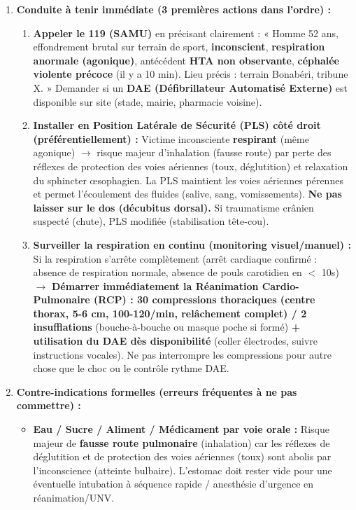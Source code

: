 \documentclass[11pt]{article}
\begin{document}
\begin{exoresolu}
\begin{enumerate}
    \item \textbf{Conduite à tenir immédiate (3 premières actions dans l'ordre) :}
        \begin{enumerate}
            \item \textbf{Appeler le 119 (SAMU)} en précisant clairement : « Homme 52 ans, effondrement brutal sur terrain de sport, \textbf{inconscient}, \textbf{respiration anormale (agonique)}, antécédent \textbf{HTA non observante}, \textbf{céphalée violente précoce} (il y a 10 min). Lieu précis : terrain Bonabéri, tribune X. » Demander si un \textbf{DAE (Défibrillateur Automatisé Externe)} est disponible sur site (stade, mairie, pharmacie voisine).
            \item \textbf{Installer en Position Latérale de Sécurité (PLS) côté droit (préférentiellement) :} Victime inconsciente \textbf{respirant} (même agonique) $\rightarrow$ risque majeur d'inhalation (fausse route) par perte des réflexes de protection des voies aériennes (toux, déglutition) et relaxation du sphincter œsophagien. La PLS maintient les voies aériennes pérennes et permet l'écoulement des fluides (salive, sang, vomissements). \textbf{Ne pas laisser sur le dos (décubitus dorsal).} Si traumatisme crânien suspecté (chute), PLS modifiée (stabilisation tête-cou).
            \item \textbf{Surveiller la respiration en continu (monitoring visuel/manuel) :} Si la respiration s'arrête complètement (arrêt cardiaque confirmé : absence de respiration normale, absence de pouls carotidien en $<$ 10s) $\rightarrow$ \textbf{Démarrer immédiatement la Réanimation Cardio-Pulmonaire (RCP) : 30 compressions thoraciques (centre thorax, 5-6 cm, 100-120/min, relâchement complet) / 2 insufflations} (bouche-à-bouche ou masque poche si formé) \textbf{+ utilisation du DAE dès disponibilité} (coller électrodes, suivre instructions vocales). Ne pas interrompre les compressions pour autre chose que le choc ou le contrôle rythme DAE.
        \end{enumerate}
    \item \textbf{Contre-indications formelles (erreurs fréquentes à ne pas commettre) :}
        \begin{itemize}
            \item \textbf{Eau / Sucre / Aliment / Médicament par voie orale :} Risque majeur de \textbf{fausse route pulmonaire} (inhalation) car les réflexes de déglutition et de protection des voies aériennes (toux) sont abolis par l'inconscience (atteinte bulbaire). L'estomac doit rester vide pour une éventuelle intubation à séquence rapide / anesthésie d'urgence en réanimation/UNV.

\end{itemize}
\end{enumerate}
\end{exoresolu}
\end{document}
